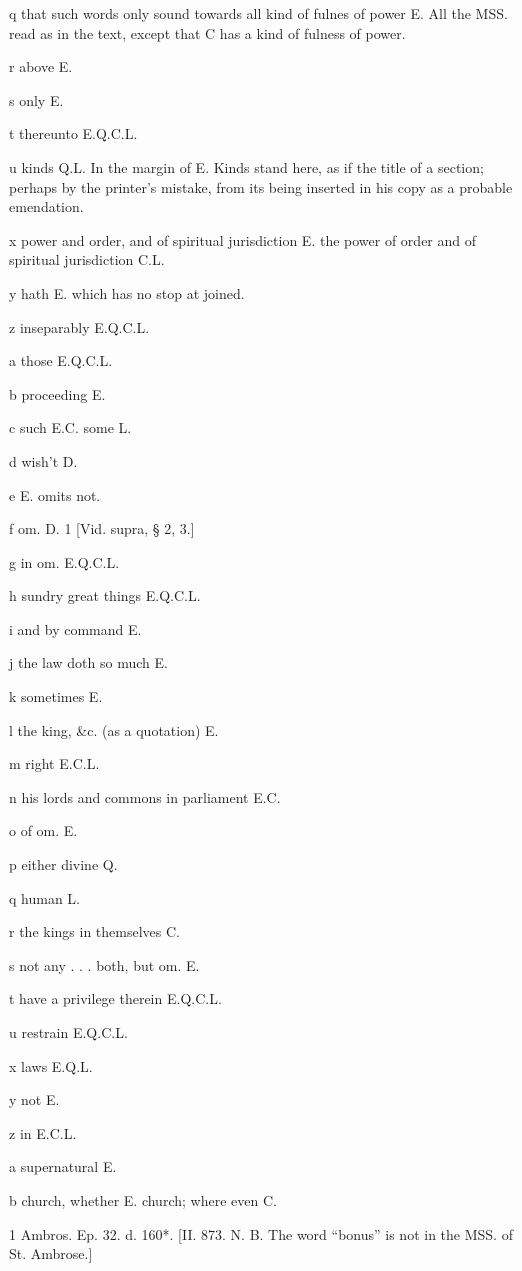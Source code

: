 q
that such words only sound towards all kind of fulnes of power E. All the MSS. read as in the text, except that C has a kind of fulness of power.

r
above E.

s
only E.

t
thereunto E.Q.C.L.

u
kinds Q.L. In the margin of E. Kinds stand here, as if the title of a section; perhaps by the printer’s mistake, from its being inserted in his copy as a probable emendation.

x
power and order, and of spiritual jurisdiction E. the power of order and of spiritual jurisdiction C.L.

y
hath E. which has no stop at joined.

z
inseparably E.Q.C.L.

a
those E.Q.C.L.

b
proceeding E.

c
such E.C. some L.

d
wish’t D.

e
E. omits not.

f om. D.
1
[Vid. supra, § 2, 3.]

g
in om. E.Q.C.L.

h
sundry great things E.Q.C.L.

i
and by command E.

j
the law doth so much E.

k
sometimes E.

l
the king, &c. (as a quotation) E.

m
right E.C.L.

n
his lords and commons in parliament E.C.

o
of om. E.

p
either divine Q.

q
human L.

r
the kings in themselves C.

s
not any . . . both, but om. E.

t
have a privilege therein E.Q.C.L.

u
restrain E.Q.C.L.

x
laws E.Q.L.

y
not E.

z
in E.C.L.

a
supernatural E.

b
church, whether E. church; where even C.

1
Ambros. Ep. 32. d. 160*. [II. 873. N. B. The word “bonus” is not in the MSS. of St. Ambrose.]

